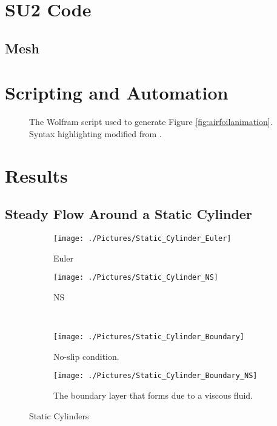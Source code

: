 \documentclass[10pt]{article}
\begin{document}
\section{SU2 Code}
\lipsum[1-2]

\subsection{Mesh}
\lipsum[1-2]

\section{Scripting and Automation}
\lipsum[1-2]

\begin{figure}[p]

\caption[Automated Wolfram Script]{The Wolfram script used to generate Figure \ref{fig:airfoilanimation}. Syntax highlighting modified from \cite{syntax}.}
\label{script}
\end{figure}

\section{Results}
\lipsum[1-2]

\subsection{Steady Flow Around a Static Cylinder}
\lipsum[1-2]

\begin{figure}[htbp]
\begin{subfigure}{0.5\linewidth}
  \centering
  \texttt{[image: ./Pictures/Static\_Cylinder\_Euler]}
  \caption{Euler}
  \label{fig:staticeuler}
\end{subfigure}
\begin{subfigure}{0.5\linewidth}
  \centering
  \texttt{[image: ./Pictures/Static\_Cylinder\_NS]}
  \caption{NS}
  \label{fig:staticNS}
\end{subfigure} \\
\begin{subfigure}{0.5\linewidth}
 \centering
 \texttt{[image: ./Pictures/Static\_Cylinder\_Boundary]}
 \caption{No-slip condition.}
 \label{fig:eulerboundary}
\end{subfigure}
\begin{subfigure}{0.5\linewidth}
 \centering
 \texttt{[image: ./Pictures/Static\_Cylinder\_Boundary\_NS]}
 \caption{The boundary layer that forms due to a viscous fluid.}
 \label{fig:nsboundary}
\end{subfigure}
\caption[Static Cylinder]{Static Cylinders}
\label{fig:static}
\end{figure}
\end{document}
